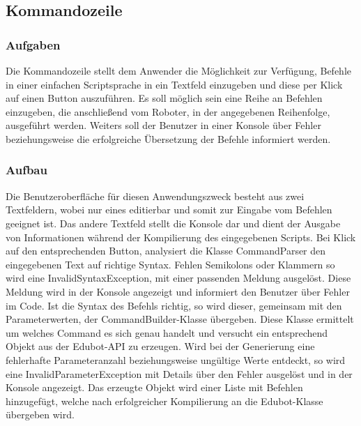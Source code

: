 
\subsection{Kommandozeile}

\subsubsection{Aufgaben}
Die Kommandozeile stellt dem Anwender die Möglichkeit zur Verfügung, Befehle in einer einfachen Scriptsprache in ein Textfeld einzugeben und diese per Klick auf einen Button auszuführen. Es soll möglich sein eine Reihe an Befehlen einzugeben, die anschließend vom Roboter, in der angegebenen Reihenfolge, ausgeführt werden. Weiters soll der Benutzer in einer Konsole über Fehler beziehungsweise die erfolgreiche Übersetzung der Befehle informiert werden.

\subsubsection{Aufbau}
Die Benutzeroberfläche für diesen Anwendungszweck besteht aus zwei Textfeldern, wobei nur eines editierbar und somit zur Eingabe vom Befehlen geeignet ist. Das andere Textfeld stellt die Konsole dar und dient der Ausgabe von Informationen während der Kompilierung des eingegebenen Scripts. Bei Klick auf den entsprechenden Button, analysiert die Klasse CommandParser den eingegebenen Text auf richtige Syntax. Fehlen Semikolons oder Klammern so wird eine InvalidSyntaxException, mit einer passenden Meldung ausgelöst. Diese Meldung wird in der Konsole angezeigt und informiert den Benutzer über Fehler im Code. Ist die Syntax des Befehls richtig, so wird dieser, gemeinsam mit den Parameterwerten, der CommandBuilder-Klasse übergeben. Diese Klasse ermittelt um welches Command es sich genau handelt und versucht ein entsprechend Objekt aus der Edubot-API zu erzeugen. Wird bei der Generierung eine fehlerhafte Parameteranzahl beziehungsweise ungültige Werte entdeckt, so wird eine InvalidParameterException mit Details über den Fehler ausgelöst und in der Konsole angezeigt. Das erzeugte Objekt wird einer Liste mit Befehlen hinzugefügt, welche nach erfolgreicher Kompilierung an die Edubot-Klasse übergeben wird.


